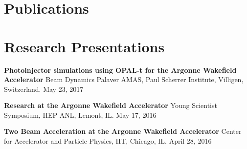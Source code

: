 \documentclass[11pt,a4paper,sans]{moderncv}        %
\begin{document}
\section{Publications}
%




\section{Research Presentations}
\iffalse
\subsection{Invited Conference} %
\textbf{Study of space charge dominated beams at the AWA rf photoinjector}\newline
Space Charge 2017, Darmstadt, Germany. Oct. 2017
\fi
\textbf{Photoinjector simulations using OPAL-t for the Argonne Wakefield Accelerator}\newline
Beam Dynamics Palaver AMAS, Paul Scherrer Institute, Villigen, Switzerland. May 23, 2017 

\textbf{Research at the Argonne Wakefield Accelerator}\newline
Young Scientist Symposium, HEP ANL, Lemont, IL. May 17, 2016 

\textbf{Two Beam Acceleration at the Argonne Wakefield Accelerator}\newline
Center for Accelerator and Particle Physics, IIT, Chicago, IL. April 28, 2016 
\end{document}
